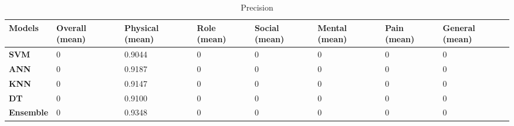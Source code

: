 \documentclass[runningheads]{llncs}
\begin{document}
\begin{table}[h]
\begin{tabular}{|C{2cm}|C{1.5cm}|C{1.5cm}|C{1.5cm}|C{1.5cm}|C{1.5cm}|C{1.5cm}|C{1.5cm}|}
\hline
{} 
{\color[HTML]{333333} \textbf{Models}} & {\color[HTML]{333333} \textbf{Overall (mean)}} & {\color[HTML]{333333} \textbf{Physical (mean)}} & {\color[HTML]{333333} \textbf{Role (mean)}} &{\color[HTML]{333333} \textbf{Social (mean)}} & {\color[HTML]{333333} \textbf{Mental (mean)}} & {\color[HTML]{333333} \textbf{Pain (mean)}} & {\color[HTML]{333333} \textbf{General (mean)}} \\ \hline
{} 
\textbf{SVM}                           & 0                                       & 0.9044                                        & 0                                                          & 0                                                            & 0                                                            & 0                                                          & 0                                      \\ \hline
{} 
\textbf{ANN}                           & 0                                       & 0.9187                                        & 0                                                          & 0                                                            & 0                                                            & 0                                                          & 0                                      \\ \hline
{} 
\textbf{KNN}                           & 0                                       & 0.9147                                        & 0                                                          & 0                                                            & 0                                                            & 0                                                          & 0                                      \\ \hline
{} 
\textbf{DT}                            & 0                                       & 0.9100                                        & 0                                                          & 0                                                            & 0                                                            & 0                                                          & 0                                      \\ \hline
{} 
\textbf{Ensemble}                      & 0                                       & 0.9348                                        & 0                                                          & 0                                                            & 0                                                            & 0                                                          & 0                                      \\ \hline
\end{tabular}
\caption{Precision}
\label{Precision}
\end{table}
\end{document}
